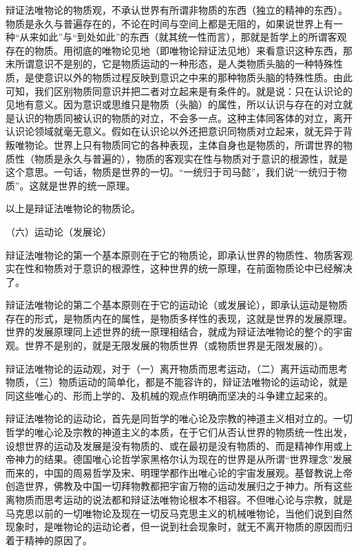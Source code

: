 \documentclass[UTF8, 12pt, a4paper]{ctexrep}
\begin{document}
辩证法唯物论的物质观，不承认世界有所谓非物质的东西（独立的精神的东西）。物质是永久与普遍存在的，不论在时间与空间上都是无阻的，如果说世界上有一种“从来如此”与“到处如此”的东西（就其统一性而言），那就是哲学上的所谓客观存在的物质。用彻底的唯物论见地（即唯物论辩证法见地）来看意识这种东西，那末所谓意识不是别的，它是物质运动的一种形态，是人类物质头脑的一种特殊性质，是使意识以外的物质过程反映到意识之中来的那种物质头脑的特殊性质。由此可知，我们区别物质同意识并把二者对立起来是有条件的。就是说：只在认识论的见地有意义。因为意识或思维只是物质（头脑）的属性，所以认识与存在的对立就是认识的物质同被认识的物质的对立，不会多一点。这种主体同客体的对立，离开认识论领域就毫无意义。假如在认识论以外还把意识同物质对立起来，就无异于背叛唯物论。世界上只有物质同它的各种表现，主体自身也是物质的，所谓世界的物质性（物质是永久与普遍的），物质的客观实在性与物质对于意识的根源性，就是这个意思。一句话，物质是世界的一切。“一统归于司马懿”，我们说“一统归于物质”。这就是世界的统一原理。

以上是辩证法唯物论的物质论。

（六）运动论（发展论）

辩证法唯物论的第一个基本原则在于它的物质论，即承认世界的物质性、物质客观实在性和物质对于意识的根源性，这种世界的统一原理，在前面物质论中已经解决了。

辩证法唯物论的第二个基本原则在于它的运动论（或发展论），即承认运动是物质存在的形式，是物质内在的属性，是物质多样性的表现，这就是世界的发展原理。世界的发展原理同上述世界的统一原理相结合，就成为辩证法唯物论的整个的宇宙观。世界不是别的，就是无限发展的物质世界（或物质世界是无限发展的）。

辩证法唯物论的运动观，对于（一）离开物质而思考运动，（二）离开运动而思考物质，（三）物质运动的简单化，都是不能容许的，辩证法唯物论的运动论，就是同这些唯心的、形而上学的、及机械的观点作明确而坚决的斗争建立起来的。

辩证法唯物论的运动论，首先是同哲学的唯心论及宗教的神道主义相对立的。一切哲学的唯心论及宗教的神道主义的本质，在于它们从否认世界的物质统一性出发，设想世界的运动及发展是没有物质的、或在最初是没有物质的、而是精神作用或上帝神力的结果。德国唯心论哲学家黑格尔认为现在的世界是从所谓“世界理念”发展而来的，中国的周易哲学及宋、明理学都作出唯心论的宇宙发展观。基督教说上帝创造世界，佛教及中国一切拜物教都把宇宙万物的运动发展归之于神力。所有这些离物质而思考运动的说法都和辩证法唯物论根本不相容。不但唯心论与宗教，就是马克思以前的一切唯物论及现在一切反马克思主义的机械唯物论，当他们说到自然现象时，是唯物论的运动论者，但一说到社会现象时，就无不离开物质的原因而归着于精神的原因了。
\end{document}
